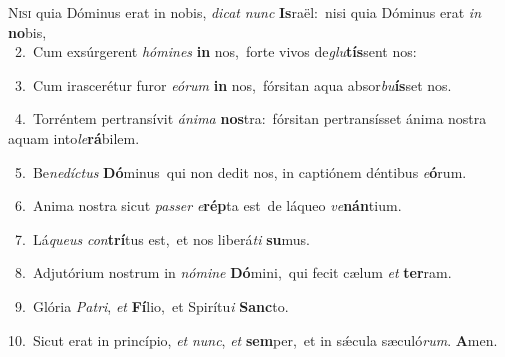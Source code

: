 \lettrine{\initial\textcolor{\initialcolor}{N}}{isi} quia Dóminus erat in nobis, \textit{di}\-\textit{cat} \textit{nunc} \textbf{Is}\-raël:~\star nisi quia Dóminus erat \textit{in} \textbf{no}\-bis,\\
{\numbfont\textcolor{\numbcolor}{~2.}}~Cum exsúrgerent \textit{hó}\-\textit{mi}\textit{nes} \textbf{in} nos,~\star forte vivos de\-\textit{glu}\-\textbf{tís}sent nos:\par
{\numbfont\textcolor{\numbcolor}{~3.}}~Cum irascerétur furor \textit{e}\-\textit{ó}\textit{rum} \textbf{in} nos,~\star fórsitan aqua absor\-\textit{bu}\-\textbf{ís}set nos.\par
{\numbfont\textcolor{\numbcolor}{~4.}}~Torréntem pertransívit \textit{á}\-\textit{ni}\textit{ma} \textbf{nos}\-tra:~\star fórsitan pertransísset ánima nostra aquam into\-\textit{le}\-\textbf{rá}bilem.\par
{\numbfont\textcolor{\numbcolor}{~5.}}~Be\-\textit{ne}\-\textit{díc}\textit{tus} \textbf{Dó}\-minus~\star qui non dedit nos, in captiónem déntibus \textit{e}\-\textbf{ó}rum.\par
{\numbfont\textcolor{\numbcolor}{~6.}}~Anima nostra sicut \textit{pas}\-\textit{ser} \textit{e}\-\textbf{rép}ta est~\star de láqueo \textit{ve}\-\textbf{nán}tium.\par
{\numbfont\textcolor{\numbcolor}{~7.}}~Lá\-\textit{que}\-\textit{us} \textit{con}\-\textbf{trí}tus est,~\star et nos liberá\textit{ti} \textbf{su}\-mus.\par
{\numbfont\textcolor{\numbcolor}{~8.}}~Adjutórium nostrum in \textit{nó}\-\textit{mi}\textit{ne} \textbf{Dó}\-mini,~\star qui fecit cælum \textit{et} \textbf{ter}\-ram.\par
{\numbfont\textcolor{\numbcolor}{~9.}}~Glória \textit{Pa}\-\textit{tri}, \textit{et} \textbf{Fí}\-lio,~\star et Spirítu\textit{i} \textbf{Sanc}\-to.\par
{\numbfont\textcolor{\numbcolor}{10.}}~Sicut erat in princípio, \textit{et} \textit{nunc}\-, \textit{et} \textbf{sem}\-per,~\star et in sǽcula sæculó\-\textit{rum}\-. \textbf{A}\-men.\par
